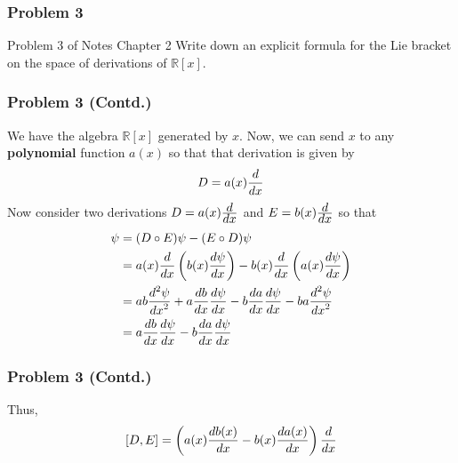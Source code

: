 \begin{frame}
\frametitle{Problem 3}
\begin{block}{Problem 3 of Notes Chapter 2}
Write down an explicit formula for the Lie bracket on the space of derivations
of $\mathbb{R}[x]$.
\end{block}
\end{frame}

\begin{frame}
\frametitle{Problem 3 (Contd.)}
We have the algebra $\mathbb{R}[x]$ generated by $x$. Now, we can send $x$ to any \textbf{polynomial} function $a(x)$ so that that derivation is given by
\[
D=a(x)\frac{\displaystyle d}{\displaystyle dx}
\]
Now consider two derivations $D=a(x)\frac{\displaystyle d}{\displaystyle dx}$ and $E=b(x)\frac{\displaystyle d}{\displaystyle dx}$ so that
\begin{align*}
[D,E]\psi&=(D\circ E)\psi-(E\circ D)\psi\\
&=a(x)\bfrac{d}{dx}\left(b(x)\bfrac{d\psi}{dx}\right)-b(x)\bfrac{d}{dx}\left(a(x)\bfrac{d\psi}{dx}\right)\\
&=ab\bfrac{d^2\psi}{dx^2}+a\bfrac{db}{dx}\bfrac{d\psi}{dx}-b\bfrac{da}{dx}\bfrac{d\psi}{dx}-ba\bfrac{d^2\psi}{dx^2}\\
&=a\bfrac{db}{dx}\bfrac{d\psi}{dx}-b\bfrac{da}{dx}\bfrac{d\psi}{dx}
\end{align*}
\end{frame}

\begin{frame}
\frametitle{Problem 3 (Contd.)}
Thus,
\[
[D,E]=\left(a(x)\frac{\displaystyle db(x)}{\displaystyle dx}-b(x)\frac{\displaystyle da(x)}{\displaystyle dx}\right)\frac{\displaystyle d}{\displaystyle dx}
\]
\end{frame}
